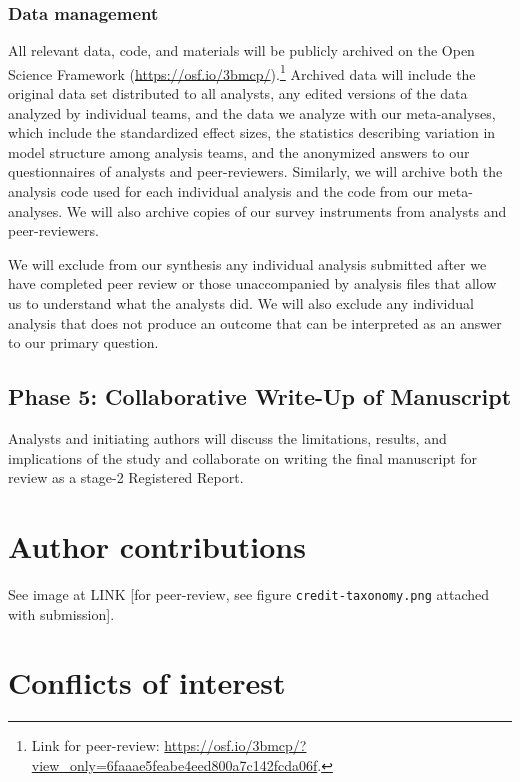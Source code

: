 \documentclass[Review,times,sageh]{sagej}
\begin{document}
\hypertarget{ana-archive}{%
\subsubsection{Data management}\label{ana-archive}}

All relevant data, code, and materials will be publicly archived on the Open Science Framework (\url{https://osf.io/3bmcp/}).\footnote{Link for peer-review: \url{https://osf.io/3bmcp/?view_only=6faaae5feabe4eed800a7c142fcda06f}.}
Archived data will include the original data set distributed to all analysts, any edited versions of the data analyzed by individual teams, and the data we analyze with our meta-analyses, which include the standardized effect sizes, the statistics describing variation in model structure among analysis teams, and the anonymized answers to our questionnaires of analysts and peer-reviewers.
Similarly, we will archive both the analysis code used for each individual analysis and the code from our meta-analyses.
We will also archive copies of our survey instruments from analysts and peer-reviewers.

We will exclude from our synthesis any individual analysis submitted after we have completed peer review or those unaccompanied by analysis files that allow us to understand what the analysts did.
We will also exclude any individual analysis that does not produce an outcome that can be interpreted as an answer to our primary question.

\hypertarget{phase-5-collaborative-write-up-of-manuscript}{%
\subsection{Phase 5: Collaborative Write-Up of Manuscript}\label{phase-5-collaborative-write-up-of-manuscript}}

Analysts and initiating authors will discuss the limitations, results, and implications of the study and collaborate on writing the final manuscript for review as a stage-2 Registered Report.

\hypertarget{author-contributions}{%
\section{Author contributions}\label{author-contributions}}

See image at LINK {[}for peer-review, see figure \texttt{credit-taxonomy.png} attached with submission{]}.

\hypertarget{conflicts-of-interest}{%
\section{Conflicts of interest}\label{conflicts-of-interest}}
\end{document}
